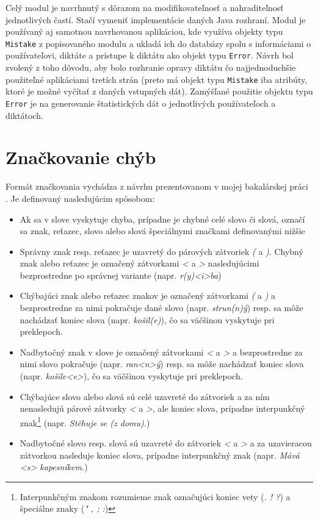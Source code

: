 \documentclass[12pt,oneside]{fithesis2}
\begin{document}
      \par Celý modul je navrhnutý s dôrazom na modifikovateľnosť a nahraditeľnosť jednotlivých častí. Stačí vymeniť implementácie daných Java rozhraní. Modul je používaný aj samotnou navrhovanou aplikáciou, kde využíva objekty typu \texttt{Mistake} z popisovaného modulu a ukladá ich do databázy spolu s informáciami o používateľovi, diktáte a prístupe k diktátu ako objekt typu \texttt{Error}. Návrh bol zvolený z toho dôvodu, aby bolo rozhranie opravy diktátu čo najjednoduchšie použiteľné aplikáciami tretích strán (preto má objekt typu \texttt{Mistake} iba atribúty, ktoré je možné vyčítať z daných vstupných dát). Zamýšľané použitie objektu typu \texttt{Error} je na generovanie štatistických dát o jednotlivých používateľoch a diktátoch.
      
	\section{Značkovanie chýb}
      \par Formát značkovania vychádza z návrhu prezentovanom v mojej bakalárskej práci \cite{rumanov12}. Je definovaný nasledujúcim spôsobom:
      \begin{itemize}
	\item Ak sa v slove vyskytuje chyba, prípadne je chybné celé slovo či slová, označí sa znak, reťazec, slovo alebo slová špeciálnymi značkami definovanými nižšie
	\item Správny znak resp. reťazec je uzavretý do párových zátvoriek \textit{(} a \textit{)}. Chybný znak alebo reťazec je označený zátvorkami \textit{<} a \textit{>} nasledujúcimi bezprostredne po správnej variante (napr. \textit{r(y)<i>ba})
	\item Chýbajúci znak alebo reťazec znakov je označený zátvorkami \textit{(} a \textit{)} a bezprostredne za nimi pokračuje dané slovo (napr. \textit{strun(n)ý}) resp. sa môže nachádzať koniec slova (napr. \textit{košil(e)}), čo sa väčšinou vyskytuje pri preklepoch.
	\item Nadbytočný znak v slove je označený zátvorkami \textit{<} a \textit{>} a bezprostredne za nimi slovo pokračuje (napr. \textit{ran<n>ý}) resp. sa môže nachádzať koniec slova (napr. \textit{košile<e>}), čo sa väčšinou vyskytuje pri preklepoch.
	\item Chýbajúce slovo alebo slová sú celé uzavreté do zátvoriek a za ním nenasledujú párové zátvorky \textit{<} a \textit{>}, ale koniec slova, prípadne interpunkčný znak\footnote{Interpunkčným znakom rozumieme znak označujúci koniec vety (\textit{. ! ?}) a špeciálne znaky (\textit{" , ; :})} (napr. \textit{Stěhuje se (z domu).})
	\item Nadbytočné slovo resp. slová sú uzavreté do zátvoriek \textit{<} a \textit{>} a za uzavieracou zátvorkou nasleduje koniec slova, prípadne interpunkčný znak (napr. \textit{Mává <s> kapesníkem.})
	\end{itemize}
\end{document}

